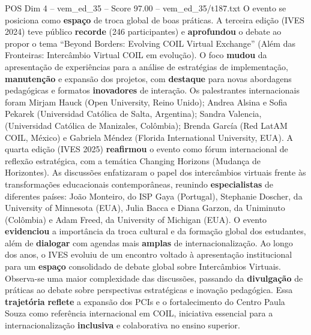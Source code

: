 \begin{textsample}{POS Dim 4 – vem\_ed\_35 – Score 97.00 – vem\_ed\_35/t187.txt}
O evento se posiciona como \textbf{espaço} de troca global de boas práticas.
A terceira edição (IVES 2024) teve público \textbf{recorde} (246 participantes) e \textbf{aprofundou} o debate ao propor o tema “Beyond Borders: Evolving COIL Virtual Exchange” (Além das Fronteiras: Intercâmbio Virtual COIL em evolução).
O foco \textbf{mudou} da apresentação de experiências para a análise de estratégias de implementação, \textbf{manutenção} e expansão dos projetos, com \textbf{destaque} para novas abordagens pedagógicas e formatos \textbf{inovadores} de interação.
Os palestrantes internacionais foram Mirjam Hauck (Open University, Reino Unido); Andrea Alsina e Sofia Pekarek (Universidad Católica de Salta, Argentina); Sandra Valencia, (Universidad Católica de Manizales, Colômbia); Brenda García (Red LatAM COIL, México) e Gabriela Méndez (Florida International University, EUA).
A quarta edição (IVES 2025) \textbf{reafirmou} o evento como fórum internacional de reflexão estratégica, com a temática Changing Horizons (Mudança de Horizontes).
As discussões enfatizaram o papel dos intercâmbios virtuais frente às transformações educacionais contemporâneas, reunindo \textbf{especialistas} de diferentes países: João Monteiro, do ISP Gaya (Portugal), Stephanie Doscher, da University of Minnesota (EUA), Julia Bacca e Diana Garzon, da Uniminuto (Colômbia) e Adam Freed, da University of Michigan (EUA).
O evento \textbf{evidenciou} a importância da troca cultural e da formação global dos estudantes, além de \textbf{dialogar} com agendas mais \textbf{amplas} de internacionalização.
Ao longo dos anos, o IVES evoluiu de um encontro voltado à apresentação institucional para um \textbf{espaço} consolidado de debate global sobre Intercâmbios Virtuais.
Observa-se uma maior complexidade das discussões, passando da \textbf{divulgação} de práticas ao debate sobre perspectivas estratégicas e inovação pedagógica.
Essa \textbf{trajetória} \textbf{reflete} a expansão dos PCIs e o fortalecimento do Centro Paula Souza como referência internacional em COIL, iniciativa essencial para a internacionalização \textbf{inclusiva} e colaborativa no ensino superior.

\end{textsample}

